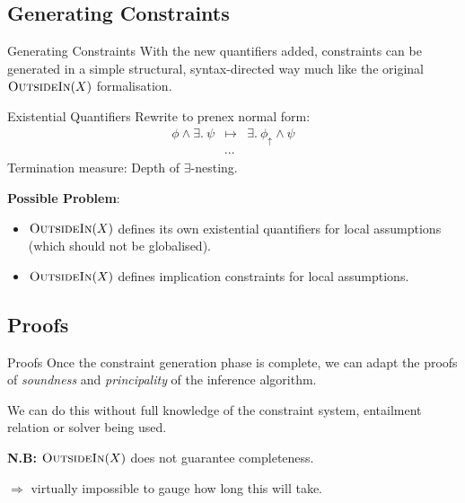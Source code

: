 \documentclass{beamer}
\begin{document}
	\subsection{Generating Constraints}
	\begin{frame}{Generating Constraints}
		With the new quantifiers added, constraints can be generated in a simple structural, syntax-directed way much like the original $\textsc{OutsideIn}(X)$ formalisation.		
	\end{frame}
	\begin{frame}{Existential Quantifiers}				
		\pause
		Rewrite to prenex normal form:
		\begin{displaymath}
			\begin{array}{lll}
				\phi \land \exists.\ \psi & \mapsto & \exists.\ \phi_\uparrow \land \psi \\
				& \cdots &
			\end{array}
		\end{displaymath}		
			Termination measure: Depth of $\exists$-nesting.
			\pause
			
			\textbf{Possible Problem}: 
			\begin{itemize}
				\item $\textsc{OutsideIn}(X)$ defines its own existential quantifiers for local assumptions (which should not be globalised).
				\item $\textsc{OutsideIn}(X)$ defines implication constraints for local assumptions.
			\end{itemize}
	\end{frame}
	\subsection{Proofs}
	\begin{frame}{Proofs}
		Once the constraint generation phase is complete, we can adapt the proofs of \emph{soundness} and \emph{principality} of the inference algorithm. 
		
		We can do this without full knowledge of the constraint system, entailment relation or solver being used.
		
		\medskip
		
		\textbf{N.B: } $\textsc{OutsideIn}(X)$ does not guarantee completeness.
		
				\medskip
		\pause
		
		$\Longrightarrow$ virtually impossible to gauge how long this will take.
	\end{frame}
\end{document}
